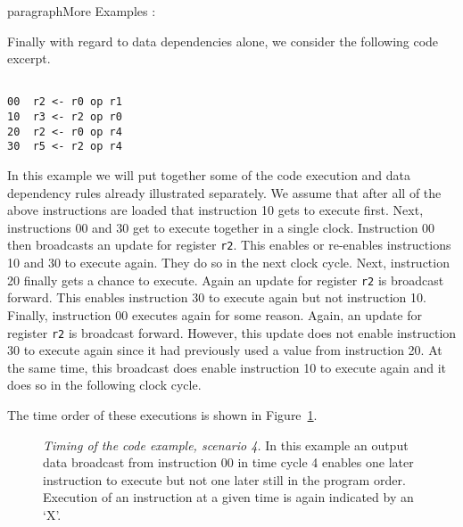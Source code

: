 paragraph{More Examples : }

Finally with regard to data dependencies alone, we consider
the following code excerpt.

\begin{verbatim}

00	r2 <- r0 op r1
10	r3 <- r2 op r0
20	r2 <- r0 op r4
30	r5 <- r2 op r4

\end{verbatim}

In this example we will put together some of the
code execution and data dependency rules already illustrated
separately.
We assume that after all of the above instructions are loaded
that instruction 10 gets to execute first.
Next, instructions 00 and 30 get to execute together in a single
clock.  Instruction 00 then broadcasts an update for register
{\tt r2}.
This enables or re-enables instructions 10 and 30 to execute again.
They do so in the next clock cycle.  Next, instruction 20 finally
gets a chance to execute.  Again an update for register
{\tt r2}
is broadcast forward.  This enables instruction 30 to execute again
but not instruction 10.
Finally, instruction 00 executes again for some reason.
Again, an update for register
{\tt r2}
is broadcast forward.  However, this update does not enable
instruction 30 to execute again since it had previously used
a value from instruction 20.  At the same time, this broadcast does
enable instruction 10 to execute again and it does so in the following
clock cycle.

The time order of these executions is shown in
Figure~\ref{ex4}.

\begin{figure}
\centering
{}
\caption{{\em Timing of the code example, scenario 4.}
In this example an output data broadcast from instruction 00
in time cycle 4 enables one later instruction to
execute but not one later still in the program order.
Execution of an instruction at a given time is
again indicated by an `X'.}
\label{ex4}
\end{figure}



